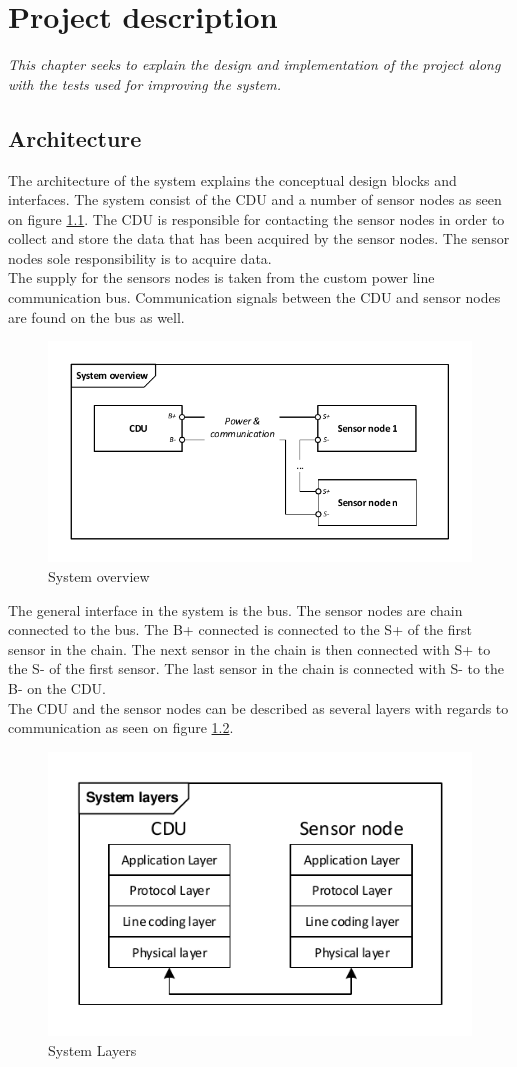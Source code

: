 \chapter{Project description}
\textit{This chapter seeks to explain the design and implementation of the project along with the tests used for improving the system.}
\section{Architecture}
The architecture of the system explains the conceptual design blocks and interfaces. The system consist of the CDU and a number of sensor nodes as seen on figure \ref{fig:systembdd}. The CDU is responsible for contacting the sensor nodes in order to collect and store the data that has been acquired by the sensor nodes. The sensor nodes sole responsibility is to acquire data.\\
The supply for the sensors nodes is taken from the custom power line communication bus. Communication signals between the CDU and sensor nodes are found on the bus as well.\\ 
\begin{figure}[H]
	\centering
	\includegraphics[width=.9\textwidth]{billeder/11ProjectDescription/systembdd}
	\caption{System overview}
	\label{fig:systembdd}
\end{figure}
The general interface in the system is the bus. The sensor nodes are chain connected to the bus. The B+ connected is connected to the S+ of the first sensor in the chain. The next sensor in the chain is then connected with S+ to the S- of the first sensor. The last sensor in the chain is connected with S- to the B- on the CDU.\\
The CDU and the sensor nodes can be described as several layers with regards to communication as seen on figure \ref{fig:systemlayers}.
\begin{figure}[H]
	\centering
	\includegraphics[width=.6\textwidth]{billeder/11ProjectDescription/System_Layers}
	\caption{System Layers}
	\label{fig:systemlayers}
\end{figure}
